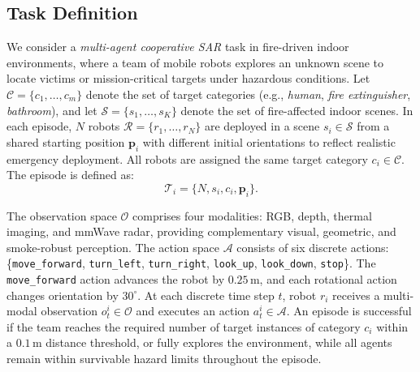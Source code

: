 \subsection{Task Definition}
We consider a \emph{multi-agent cooperative SAR} task in fire-driven indoor environments, where a team of mobile robots explores an unknown scene to locate victims or mission-critical targets under hazardous conditions. Let $\mathcal{C} = \{c_1, \ldots, c_m\}$ denote the set of target categories (e.g., \emph{human}, \emph{fire extinguisher}, \emph{bathroom}), and let $\mathcal{S} = \{s_1, \ldots, s_K\}$ denote the set of fire-affected indoor scenes. In each episode, $N$ robots $\mathcal{R} = \{r_1, \ldots, r_N\}$ are deployed in a scene $s_i \in \mathcal{S}$ from a shared starting position $\mathbf{p}_i$ with different initial orientations to reflect realistic emergency deployment. All robots are assigned the same target category $c_i \in \mathcal{C}$. The episode is defined as:
\begin{equation}
\mathcal{T}_i = \{N, s_i, c_i, \mathbf{p}_i\}.
\end{equation}

The observation space $\mathcal{O}$ comprises four modalities: RGB, depth, thermal imaging, and mmWave radar, providing complementary visual, geometric, and smoke-robust perception. The action space $\mathcal{A}$ consists of six discrete actions:
\{\texttt{move\_forward}, \texttt{turn\_left}, \texttt{turn\_right}, \texttt{look\_up}, \texttt{look\_down}, \texttt{stop}\}. The \texttt{move\_forward} action advances the robot by $0.25\,\text{m}$, and each rotational action changes orientation by $30^{\circ}$. At each discrete time step $t$, robot $r_i$ receives a multi-modal observation $o_t^i \in \mathcal{O}$ and executes an action $a_t^i \in \mathcal{A}$. An episode is successful if the team reaches the required number of target instances of category $c_i$ within a $0.1\,\text{m}$ distance threshold, or fully explores the environment, while all agents remain within survivable hazard limits throughout the episode.


